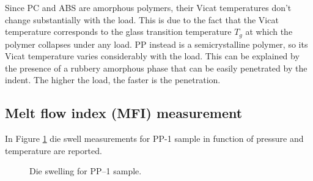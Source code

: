 \documentclass[a4paper, 11pt]{article}
\begin{document}
Since PC and ABS are amorphous polymers, their Vicat temperatures don't change substantially with the load. This is due to the fact that the Vicat temperature corresponds to the glass transition temperature $T_{g}$ at which the polymer collapses under any load.
PP instead is a semicrystalline polymer, so its Vicat temperature varies considerably with the load. This can be explained by the presence of a rubbery amorphous phase that can be easily penetrated by the indent. The higher the load, the faster is the penetration.

\subsection{Melt flow index (MFI) measurement}

In Figure \ref{fig:dieswell} die swell measurements for PP-1 sample in function of pressure and temperature are reported.
\begin{figure}[h!]
	\centering
	 \quad 
	\captionsetup{justification=centering}
	\caption{Die swelling for PP–1 sample.}
	\label{fig:dieswell}
\end{figure}\\
\end{document}
